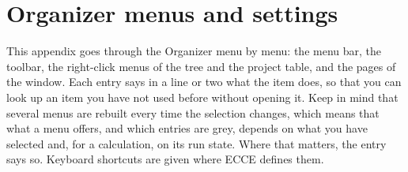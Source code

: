 \chapter{Organizer menus and settings}
\label{ch:menus-organizer}


This appendix goes through the Organizer menu by menu: the menu bar, the toolbar, the right-click menus of the tree and the project table, and the pages of the  window. Each entry says in a line or two what the item does, so that you can look up an item you have not used before without opening it. Keep in mind that several menus are rebuilt every time the selection changes, which means that what a menu offers, and which entries are grey, depends on what you have selected and, for a calculation, on its run state. Where that matters, the entry says so. Keyboard shortcuts are given where ECCE defines them.

